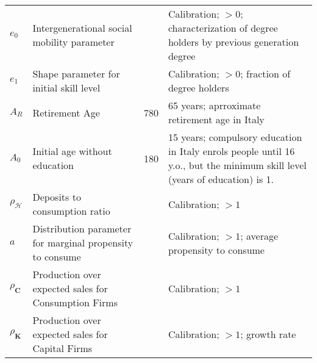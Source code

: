 \documentclass[a4paper, headings=standardclasses]{scrartcl}
\begin{document}
\begin{xltabular}{\linewidth}{lXlX}
    $e_0$                        & Intergenerational social mobility parameter                  &       & Calibration; $>0$; characterization of degree holders by previous generation degree                                                                                                                                                          \\
    $e_1$                        & Shape parameter for initial skill level                      &      & Calibration; $>0$; fraction of degree holders                                                                                                                                                           \\
    $A_R$                        & Retirement Age                                               & 780   & 65 years; aprroximate retirement age in Italy                                                                                                                                                         \\
    $A_0$                        & Initial age without education                                & 180   & 15 years; compulsory education in Italy enrols people until 16 y.o., but the minimum skill level (years of education) is 1.                                                                                                                                                            \\
    $\rho_\mathcal{H}$           & Deposits to consumption ratio                                &       & Calibration; $>1$                                                                                                                                                         \\
    $a$                          & Distribution parameter for marginal propensity to consume    &       & Calibration; $>1$; average propensity to consume                                                                                                                                                          \\
    $\rho_\mathbf{C}$            & Production over expected sales for Consumption Firms         &       & Calibration; $>1$                                                                                                                                                         \\
    $\rho_\mathbf{K}$            & Production over expected sales for Capital Firms             &       & Calibration; $>1$; growth rate                                                                                                                                                            \\

\end{xltabular}
\end{document}
